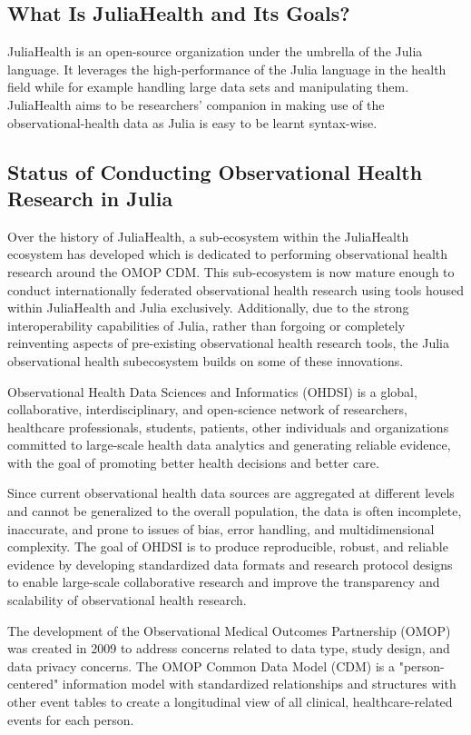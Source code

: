 \documentclass{juliacon}
\begin{document}
\subsection{What Is JuliaHealth and Its Goals?}
JuliaHealth is an open-source organization under the umbrella of the Julia language. It leverages the high-performance of the Julia language in the health field while for example handling large data sets and manipulating them. JuliaHealth aims to be researchers' companion in making use of the observational-health data as Julia is easy to be learnt syntax-wise.

\subsection{Status of Conducting Observational Health Research in Julia}

Over the history of JuliaHealth, a sub-ecosystem within the JuliaHealth ecosystem has developed which is dedicated to performing observational health research around the OMOP CDM.
This sub-ecosystem is now mature enough to conduct internationally federated observational health research using tools housed within JuliaHealth and Julia exclusively.
Additionally, due to the strong interoperability capabilities of Julia, rather than forgoing or completely reinventing aspects of pre-existing observational health research tools, the Julia observational health subecosystem builds on some of these innovations.

Observational Health Data Sciences and Informatics (OHDSI) is a global, collaborative, interdisciplinary, and open-science network of researchers, healthcare professionals, students, patients, other individuals and organizations committed to large-scale health data analytics and generating reliable evidence, with the goal of promoting better health decisions and better care. 

Since current observational health data sources are aggregated at different levels and cannot be generalized to the overall population, the data is often incomplete, inaccurate, and prone to issues of bias, error handling, and multidimensional complexity. The goal of OHDSI is to produce reproducible, robust, and reliable evidence by developing standardized data formats and research protocol designs to enable large-scale collaborative research and improve the transparency and scalability of observational health research. 

The development of the Observational Medical Outcomes Partnership (OMOP) was created in 2009 to address concerns related to data type, study design, and data privacy concerns. The OMOP Common Data Model (CDM) is a "person-centered" information model with standardized relationships and structures with other event tables to create a longitudinal view of all clinical, healthcare-related events for each person. 
\end{document}
